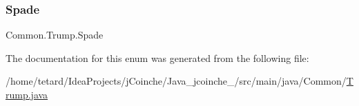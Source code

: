 \subsubsection{\texorpdfstring{Spade}{Spade}}
{\footnotesize\ttfamily Common.\+Trump.\+Spade}



The documentation for this enum was generated from the following file\+:\begin{DoxyCompactItemize}
\item 
/home/tetard/\+Idea\+Projects/j\+Coinche/\+Java\+\_\+jcoinche\+\_/src/main/java/\+Common/\mbox{\hyperlink{Trump_8java}{Trump.\+java}}\end{DoxyCompactItemize}

